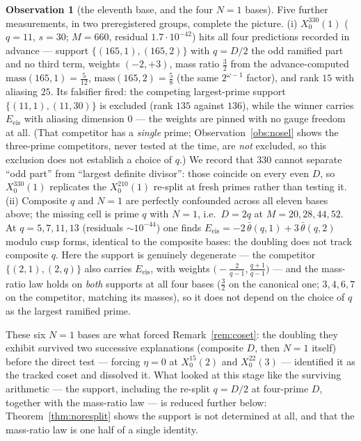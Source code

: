 \documentclass[11pt,reqno]{amsart}
\theoremstyle{plain}
\theoremstyle{definition}
\newtheorem{observation}[theorem]{Observation}
\begin{document}
\begin{observation}[the eleventh base, and the four $N=1$ bases]\label{obs:n1}
Five further measurements, in two preregistered groups, complete the picture. (i)
$X_0^{330}(1)$ ($q=11$, $s=30$; $M=660$, residual $1.7\cdot10^{-42}$) hits all four
predictions recorded in advance --- support $\{(165,1),(165,2)\}$ with $q=D/2$ the odd
ramified part and no third term, weights $(-2,+3)$, mass ratio $\tfrac32$ from the
advance-computed $\mathrm{mass}(165,1)=\tfrac5{12}$, $\mathrm{mass}(165,2)=\tfrac58$
(the same $2^{\omega-1}$ factor), and rank $15$ with aliasing $25$. Its falsifier fired:
the competing largest-prime support $\{(11,1),(11,30)\}$ is excluded (rank $135$ against
$136$), while the winner carries $E_{\mathrm{eis}}$ with aliasing dimension $0$ --- the
weights are pinned with no gauge freedom at all. (That competitor has a \emph{single}
prime; Observation~\ref{obs:nosel} shows the three-prime competitors, never tested at the
time, are \emph{not} excluded, so this exclusion does not establish a choice of $q$.) We record that $330$ cannot separate
``odd part'' from ``largest definite divisor'': those coincide on every even $D$, so
$X_0^{330}(1)$ replicates the $X_0^{210}(1)$ re-split at fresh primes rather than testing
it. (ii) Composite $q$ and $N=1$ are perfectly confounded across all eleven bases above;
the missing cell is prime $q$ with $N=1$, i.e.\ $D=2q$ at $M=20,28,44,52$. At
$q=5,7,11,13$ (residuals $\sim10^{-44}$) one finds
$E_{\mathrm{eis}}=-2\,\bar\theta(q,1)+3\,\bar\theta(q,2)$ modulo cusp forms, identical to
the composite bases: the doubling does not track composite $q$. Here the support is
genuinely degenerate --- the competitor $\{(2,1),(2,q)\}$ also carries $E_{\mathrm{eis}}$,
with weights $\bigl(-\tfrac2{q-1},\tfrac{q+1}{q-1}\bigr)$ --- and the mass-ratio law holds
on \emph{both} supports at all four bases ($\tfrac32$ on the canonical one;
$3,4,6,7$ on the competitor, matching its masses), so it does not depend on the choice of
$q$ as the largest ramified prime.
\end{observation}

These six $N=1$ bases are what forced Remark~\ref{rem:coset}: the doubling they exhibit
survived two successive explanations (composite $D$, then $N=1$ itself) before the direct
test --- forcing $\eta=0$ at $X_0^{15}(2)$ and $X_0^{22}(3)$ --- identified it as the
tracked coset and dissolved it. What looked at this stage like the surviving arithmetic ---
the support, including the re-split $q=D/2$ at four-prime $D$, together with the mass-ratio
law --- is reduced further below: Theorem~\ref{thm:noresplit} shows the support is not
determined at all, and that the mass-ratio law is one half of a single identity.
\end{document}
